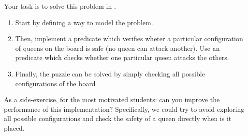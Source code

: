 \documentclass{../../../tp}
\begin{document}
Your task is to solve this problem in \prolog.

\begin{instruction}
	\begin{enumerate}
		\item Start by defining a way to model the problem.
		\item Then, implement a  predicate which verifies wheter a particular configuration of queens on the board is safe (no queen can attack another). Use an  predicate which checks whether one particular queen attacks the others.
		\item Finally, the puzzle can be solved by simply checking all possible configurations of the board
	\end{enumerate}
	
	As a side-exercise, for the most motivated students: can you improve the performance of this implementation? Specifically, we could try to avoid exploring all possible configurations and check the safety of a queen directly when is it placed.
\end{instruction}
\end{document}
